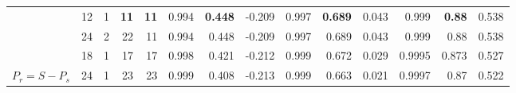 \documentclass[journal]{IEEEtran}
\begin{document}
\begin{table}[]
\begin{tabular}{|l|rrrr|rrr|rrr|rrr|}
                              & 12                                         & 1                                            & {\color[HTML]{5B9BD5} \textbf{11}}           & {\color[HTML]{5B9BD5} \textbf{11}}           & 0.994     & {\color[HTML]{5B9BD5} \textbf{0.448}} & -0.209        & 0.997     & {\color[HTML]{5B9BD5} \textbf{0.689}} & 0.043         & 0.999     & {\color[HTML]{5B9BD5} \textbf{0.88}}  & 0.538         \\
                              & 24                                         & 2                                            & 22                                           & 11                                           & 0.994     & 0.448                                 & -0.209        & 0.997     & 0.689                                 & 0.043         & 0.999     & 0.88                                  & 0.538         \\
                              & 18                                         & 1                                            & 17                                           & 17                                           & 0.998     & 0.421                                 & -0.212        & 0.999     & 0.672                                 & 0.029         & 0.9995    & 0.873                                 & 0.527         \\
\multirow{-5}{*}{$P_r=S-P_s$} & 24                                         & 1                                            & 23                                           & 23                                           & 0.999     & 0.408                                 & -0.213        & 0.999     & 0.663                                 & 0.021         & 0.9997    & 0.87                                  & 0.522         \\ \hline
\end{tabular}
\end{table}

\end{document}

